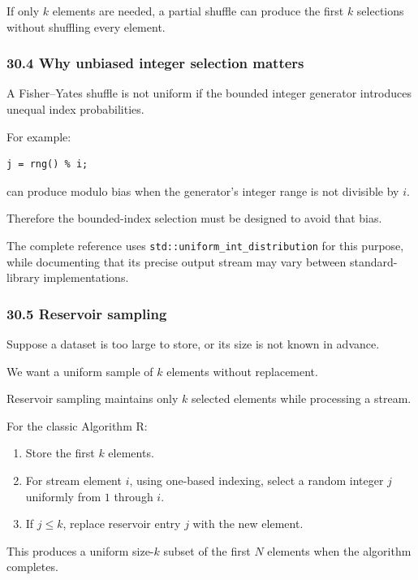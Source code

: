 If only \(k\) elements are needed, a partial shuffle can produce the first \(k\) selections without shuffling every element.

\subsubsection{30.4 Why unbiased integer selection matters}\label{why-unbiased-integer-selection-matters}

A Fisher--Yates shuffle is not uniform if the bounded integer generator introduces unequal index probabilities.

For example:

\begin{verbatim}
j = rng() % i;
\end{verbatim}

can produce modulo bias when the generator's integer range is not divisible by \(i\).

Therefore the bounded-index selection must be designed to avoid that bias.

The complete reference uses \texttt{std::uniform\_int\_distribution} for this purpose, while documenting that its precise output stream may vary between standard-library implementations.

\subsubsection{30.5 Reservoir sampling}\label{reservoir-sampling}

Suppose a dataset is too large to store, or its size is not known in advance.

We want a uniform sample of \(k\) elements without replacement.

Reservoir sampling maintains only \(k\) selected elements while processing a stream.

For the classic Algorithm R:

\begin{enumerate}
\def\labelenumi{\arabic{enumi}.}
\tightlist
\item
  Store the first \(k\) elements.
\item
  For stream element \(i\), using one-based indexing, select a random integer \(j\) uniformly from \(1\) through \(i\).
\item
  If \(j\le k\), replace reservoir entry \(j\) with the new element.
\end{enumerate}

This produces a uniform size-\(k\) subset of the first \(N\) elements when the algorithm completes.

